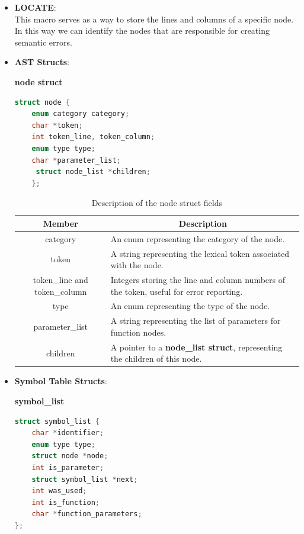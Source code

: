 \documentclass[12pt]{article}
\begin{document}
\begin{itemize}
    
    \item \textbf{LOCATE}: \\ This macro serves as a way to store the lines and columns of a specific node. In this way we can identify the nodes that are responsible for creating semantic errors.
    \item \textbf{AST Structs}: \\
    \begin{center}
        \textbf{node struct}
    \end{center}
        \begin{center}
            \begin{lstlisting}[language=C, basicstyle=\small\ttfamily]
struct node {
    enum category category;  
    char *token;
    int token_line, token_column; 
    enum type type;
    char *parameter_list;
     struct node_list *children;
    };
        \end{lstlisting}
    \end{center}
        \begin{table}[h!]
            \centering
            \begin{tabular}{|c|p{10cm}|}
            \hline
            Member & \multicolumn{1}{|c|}{Description} \\
            \hline
            category & An enum representing the category of the node. \\
            \hline
            token & A string representing the lexical token associated with the node. \\
            \hline
            token\_line and token\_column & Integers storing the line and column numbers of the token, useful for error reporting. \\
            \hline
            type & An enum representing the type of the node. \\
            \hline
            parameter\_list & A string representing the list of parameters for function nodes. \\
            \hline
            children & A pointer to a \textbf{node\_list struct}, representing the children of this node. \\
            \hline
            \end{tabular}
            \caption{Description of the node struct fields}
            \label{tab:node_struct}
        \end{table}
    
    \item \textbf{Symbol Table Structs}: \\  
    \begin{center}
        \textbf{symbol\_list}
    \end{center}
    \begin{center}
        \begin{lstlisting}[language=C, basicstyle=\small\ttfamily]
struct symbol_list {
    char *identifier;
    enum type type;
    struct node *node;
    int is_parameter;
    struct symbol_list *next;
    int was_used;
    int is_function;
    char *function_parameters;
};


\end{lstlisting}
\end{center}
\end{itemize}
\end{document}
